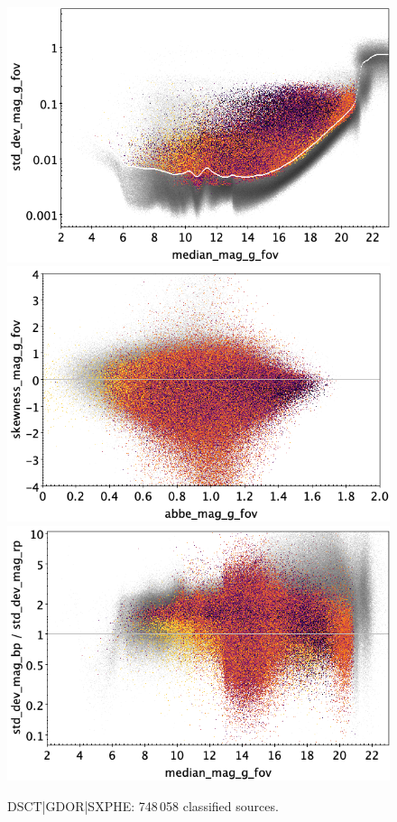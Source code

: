 \documentclass[longauth]{aa}
\begin{document}
\begin{appendix}
\begin{figure}
\hspace{2mm}
 \includegraphics[width=0.45\hsize]{figures/appendix/DSCT_cls_msd.png} \\ %
\vspace{4mm}
 \includegraphics[width=0.45\hsize]{figures/appendix/DSCT_cls_ask.png}  %
\hspace{2mm}
 \includegraphics[width=0.45\hsize]{figures/appendix/DSCT_cls_msdr.png}  \\ %
\vspace{4mm}
 \caption{DSCT|GDOR|SXPHE: 748\,058 classified sources.}  
 \label{fig:app:DSCT}
\end{figure}


\end{appendix}
\end{document}

